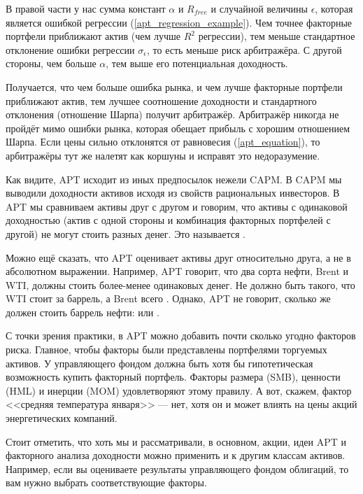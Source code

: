 В правой части у нас сумма констант $\alpha$ и $R_{free}$ и случайной величины
$\epsilon$, которая является ошибкой регрессии (\ref{apt_regression_example}). 
Чем точнее факторные портфели приближают актив (чем лучше $R^2$ регрессии), тем 
меньше стандартное отклонение ошибки регрессии $\sigma_{\epsilon}$, то есть 
меньше риск арбитражёра. С другой стороны, чем больше $\alpha$, тем выше его 
потенциальная доходность.

Получается, что чем больше ошибка рынка, и чем лучше факторные портфели 
приближают актив, тем лучшее соотношение доходности и стандартного отклонения 
(отношение Шарпа) получит арбитражёр. Арбитражёр никогда не пройдёт мимо ошибки 
рынка, которая обещает прибыль с хорошим отношением Шарпа. Если цены сильно 
отклонятся от равновесия (\ref{apt_equation}), то арбитражёры тут же налетят как 
коршуны и исправят это недоразумение.

Как видите, APT исходит из иных предпосылок нежели CAPM. В CAPM мы выводили 
доходности активов исходя из свойств рациональных инвесторов. В APT мы 
сравниваем активы друг с другом и говорим, что активы с одинаковой доходностью 
(актив с одной стороны и комбинация факторных портфелей с другой) не могут 
стоить разных денег. Это называется . 

Можно ещё сказать, что APT оценивает активы друг относительно друга, а не в 
абсолютном выражении. Например, APT говорит, что два сорта нефти, Brent и WTI, 
должны стоить более-менее одинаковых денег. Не должно быть такого, что WTI стоит 
 за баррель, а Brent всего . Однако, APT не говорит, 
сколько же должен стоить баррель нефти:  или .

С точки зрения практики, в APT можно добавить почти сколько угодно факторов 
риска. Главное, чтобы факторы были представлены портфелями торгуемых активов. У 
управляющего фондом должна быть хотя бы гипотетическая возможность купить 
факторный портфель. Факторы размера (SMB), ценности (HML) и инерции (MOM) 
удовлетворяют этому правилу. А вот, скажем, фактор <<средняя температура 
января>> --- нет, хотя он и может влиять на цены акций энергетических компаний.

Стоит отметить, что хоть мы и рассматривали, в основном, акции, идеи APT и 
факторного анализа доходности можно применить и к другим классам активов. 
Например, если вы оцениваете результаты управляющего фондом облигаций, то вам 
нужно выбрать соответствующие факторы.


